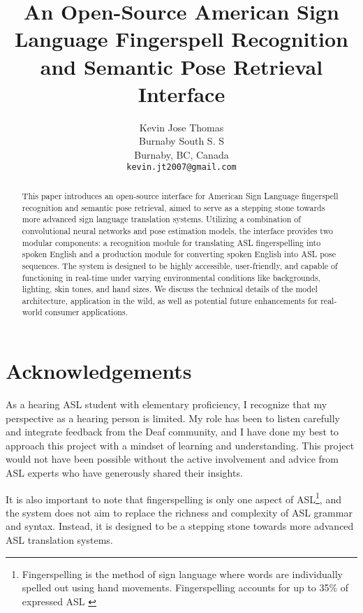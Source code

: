 \documentclass[11pt]{article}
\title{An Open-Source American Sign Language Fingerspell Recognition and Semantic Pose Retrieval Interface}
\author{Kevin Jose Thomas \\
  Burnaby South S. S \\
  Burnaby, BC, Canada\\
  {\tt kevin.jt2007@gmail.com} \\
}
\begin{document}
\maketitle
\begin{abstract}
  This paper introduces an open-source interface for American Sign Language fingerspell recognition and semantic pose retrieval, aimed to serve as a stepping stone towards more advanced sign language translation systems. Utilizing a combination of convolutional neural networks and pose estimation models, the interface provides two modular components: a recognition module for translating ASL fingerspelling into spoken English and a production module for converting spoken English into ASL pose sequences. The system is designed to be highly accessible, user-friendly, and capable of functioning in real-time under varying environmental conditions like backgrounds, lighting, skin tones, and hand sizes. We discuss the technical details of the model architecture, application in the wild, as well as potential future enhancements for real-world consumer applications.
\end{abstract}

\section*{Acknowledgements}
As a hearing ASL student with elementary proficiency, I recognize that my perspective as a hearing person is limited. My role has been to listen carefully and integrate feedback from the Deaf community, and I have done my best to approach this project with a mindset of learning and understanding. This project would not have been possible without the active involvement and advice from ASL experts who have generously shared their insights.

It is also important to note that fingerspelling is only one aspect of ASL\footnote{Fingerspelling is the method of sign language where words are individually spelled out using hand movements. Fingerspelling accounts for up to 35\% of expressed ASL \cite{fingerspelling_stats}}, and the system does not aim to replace the richness and complexity of ASL grammar and syntax. Instead, it is designed to be a stepping stone towards more advanced ASL translation systems.











\renewcommand{\bibfont}{\small}
\setlength{\bibsep}{0pt}


\end{document}
